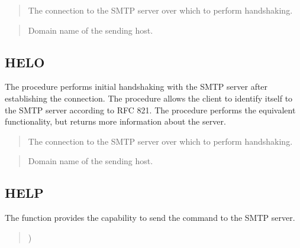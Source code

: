 \documentclass[letterpaper,10pt,english,openany,oneside]{sphinxmanual}
\begin{document}

\begin{quote}

The connection to the SMTP server over which to perform handshaking.
\end{quote}

\begin{quote}

Domain name of the sending host.
\end{quote}


\subsection{HELO}
\label{\detokenize{utl_smtp:helo}}
The  procedure performs initial handshaking with the SMTP server
after establishing the connection. The  procedure allows the client
to identify itself to the SMTP server according to RFC 821. The 
procedure performs the equivalent functionality, but returns more
information about the server.
\begin{quote}

\end{quote}


\begin{quote}

The connection to the SMTP server over which to perform handshaking.
\end{quote}

\begin{quote}

Domain name of the sending host.
\end{quote}


\subsection{HELP}
\label{\detokenize{utl_smtp:help}}
The  function provides the capability to send the  command to
the SMTP server.
\begin{quote}

)
\end{quote}
\end{document}
